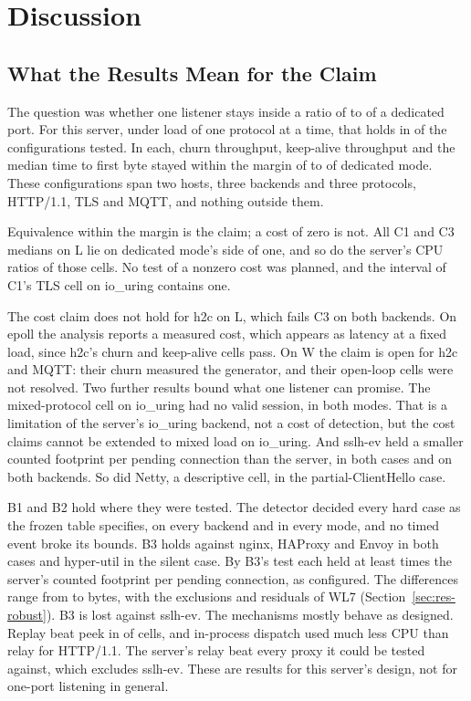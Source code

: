 \section{Discussion}\label{sec:discussion}

\subsection{What the Results Mean for the Claim}\label{sec:disc-claim}

The question was whether one listener stays inside a ratio of \MarginLow{} to \MarginHigh{} of a
dedicated port. For this server, under load of one protocol at a time, that holds in
\CostClaimCount{} of the configurations tested. In each, churn throughput, keep-alive throughput and the median time to
first byte stayed within the margin of \MarginLow{} to \MarginHigh{} of dedicated mode. These
configurations span two hosts, three backends and three protocols, HTTP/1.1, TLS and MQTT, and
nothing outside them.

Equivalence within the margin is the claim; a cost of zero is not. All C1 and C3 medians on L lie
on dedicated mode's side of one, and so do the server's CPU ratios of those cells. No test of a
nonzero cost was planned, and the interval of C1's TLS cell on io\_uring contains one.

The cost claim does not hold for h2c on L, which fails C3 on both backends. On epoll the analysis
reports a measured cost, which appears as latency at a fixed load, since h2c's churn and keep-alive
cells pass. On W the claim is open for h2c and MQTT: their churn measured the generator, and their
open-loop cells were not resolved. Two further results bound what one listener can promise. The
mixed-protocol cell on io\_uring had no valid session, in both modes. That is a limitation of the
server's io\_uring backend, not a cost of detection, but the cost claims cannot be extended to mixed
load on io\_uring. And sslh-ev held a smaller counted footprint per pending connection than the
server, in both cases and on both backends. So did Netty, a descriptive cell, in the
partial-ClientHello case.

B1 and B2 hold where they were tested. The detector decided every hard case as the frozen table
specifies, on every backend and in every mode, and no timed event broke its bounds. B3 holds against
nginx, HAProxy and Envoy in both cases and hyper-util in the silent case. By B3's test each held at
least \FootprintMargin{} times the server's counted footprint per pending connection, as
configured. The differences range from \BThreeSilentHyperUtilIouringDMedian{} to
\BThreePartialHelloEnvoyEpollDMedian{} bytes, with the exclusions and residuals of WL7
(Section~\ref{sec:res-robust}). B3 is lost against sslh-ev. The mechanisms mostly behave as
designed. Replay beat peek in \CountPassMOne{} of \CountHolmMOne{} cells, and in-process dispatch
used much less CPU than relay for HTTP/1.1. The server's relay beat every proxy it could be tested
against, which excludes sslh-ev. These are results for this server's design, not for one-port
listening in general.

